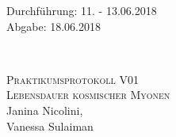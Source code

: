 



\begin{titlepage}
  \begin{flushleft}
 Durchführung: 11. - 13.06.2018\\
 Abgabe: 18.06.2018
  \end{flushleft}


\HRule\\[1,0cm]

 \begin{center}


\textsc{\LARGE Praktikumsprotokoll V01}\\[1.5cm]
\textsc{\huge Lebensdauer kosmischer Myonen} \\[5,5cm]

Janina Nicolini\footnotemark[1], \\
Vanessa Sulaiman\footnotemark[2] \\[1,0cm]



 \end{center}
\HRule

 \vfill

\end{titlepage}






\printbibliography


